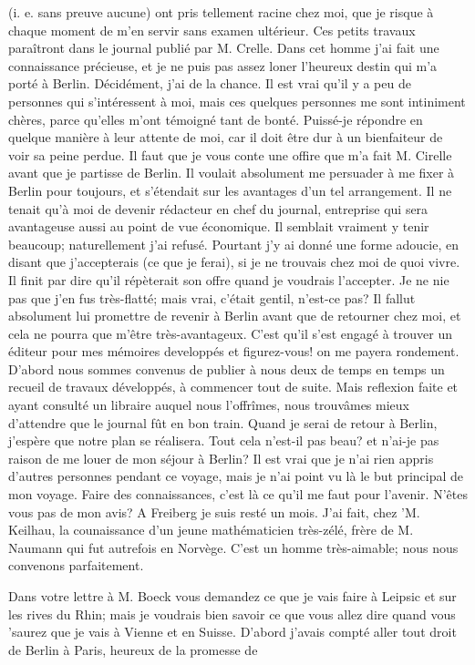 \documentclass{article}
\begin{document}
(i. e. sans preuve aucune) ont pris tellement racine chez moi, que je risque à chaque moment de m'en servir sans examen ultérieur. Ces petits travaux paraîtront dans le journal publié par M. Crelle. Dans cet homme j'ai fait une connaissance précieuse, et je ne puis pas assez loner l'heureux destin qui m'a porté à Berlin. Décidément, j'ai de la chance. Il est vrai qu'il y a peu de personnes qui s'intéressent à moi, mais ces quelques personnes me sont intiniment chères, parce qu'elles m'ont témoigné tant de bonté. Puissé-je répondre en quelque manière à leur attente de moi, car il doit être dur à un bienfaiteur de voir sa peine perdue. Il faut que je vous conte une offire que m'a fait M. Cirelle avant que je partisse de Berlin. Il voulait absolument me persuader à me fixer à Berlin pour toujours, et s'étendait sur les avantages d'un tel arrangement. Il ne tenait qu’à moi de devenir rédacteur en chef du journal, entreprise qui sera avantageuse aussi au point de vue économique. Il semblait vraiment y tenir beaucoup; naturellement j'ai refusé. Pourtant j'y ai donné une forme adoucie, en disant que j'accepterais (ce que je ferai), si je ne trouvais chez moi de quoi vivre. Il finit par dire qu'il répèterait son offre quand je voudrais l'accepter. Je ne nie pas que j'en fus très-flatté; mais vrai, c'était gentil, n'est-ce pas? Il fallut absolument lui promettre de revenir à Berlin avant que de retourner chez moi, et cela ne pourra que m'être très-avantageux. C'est qu'il s'est engagé à trouver un éditeur pour mes mémoires developpés et figurez-vous! on me payera rondement. D'abord nous sommes convenus de publier à nous deux de temps en temps un recueil de travaux développés, à commencer tout de suite. Mais reflexion faite et ayant consulté un libraire auquel nous l'offrîmes, nous trouvâmes mieux d'attendre que le journal fût en bon train. Quand je serai de retour à Berlin, j'espère que notre plan se réalisera. Tout cela n'est-il pas beau? et n'ai-je pas raison de me louer de mon séjour à Berlin? Il est vrai que je n'ai rien appris d'autres personnes pendant ce voyage, mais je n'ai point vu là le but principal de mon voyage. Faire des connaissances, c'est là ce qu'il me faut pour l'avenir. N'êtes vous pas de mon avis? A Freiberg je suis resté un mois. J'ai fait, chez 'M. Keilhau, la counaissance d'un jeune mathématicien très-zélé, frère de M. Naumann qui fut autrefois en Norvège. C'est un homme très-aimable; nous nous convenons parfaitement.

Dans votre lettre à M. Boeck vous demandez ce que je vais faire à Leipsic et sur les rives du Rhin; mais je voudrais bien savoir ce que vous allez dire quand vous 'saurez que je vais à Vienne et en Suisse. D'abord j'avais compté aller tout droit de Berlin à Paris, heureux de la promesse de
\end{document}
